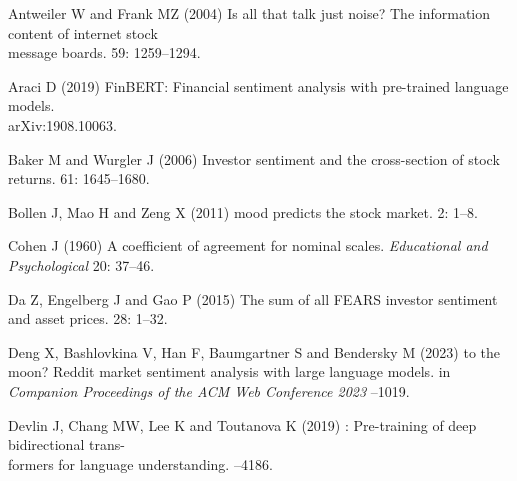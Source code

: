 \documentclass{aims}
\numberwithin{equation}{section}
\begin{document}
\begin{thebibliography}{}

\newblock Antweiler W and Frank MZ (2004)
\newblock Is all that talk just noise? The information content of internet stock\\ 
message boards.
 59: 1259--1294. 

\newblock Araci D (2019)
\newblock FinBERT: Financial sentiment analysis with pre-trained language models.\\
\newblock arXiv:1908.10063. 

\newblock Baker M and Wurgler J (2006)
\newblock Investor sentiment and the cross-section of stock returns.
 61: 1645--1680. 

\newblock Bollen J, Mao H and Zeng X (2011)
 mood predicts the stock market.
 2: 1--8. 

\newblock Cohen J (1960)
\newblock A coefficient of agreement for nominal scales. {\em Educational and Psychological}
 20: 37--46. 
  
\newblock Da Z, Engelberg J and Gao P (2015)
\newblock The sum of all {FEARS} investor sentiment and asset prices.
 28: 1--32. 
  
\newblock Deng X, Bashlovkina V, Han F, Baumgartner S and Bendersky M (2023)
 to the moon? {Reddit} market sentiment analysis with large
  language models.
\newblock in {\em Companion Proceedings of the ACM Web Conference 2023}
--1019. 

\newblock Devlin J, Chang MW, Lee K and Toutanova K (2019)
: Pre-training of deep bidirectional trans-\\
formers for language understanding.
--4186. 


\end{thebibliography}
\end{document}
